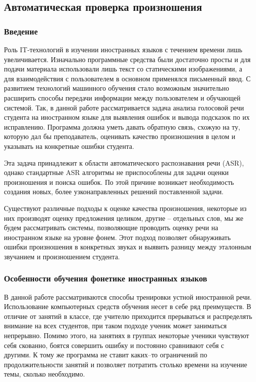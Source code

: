 \subsection{Автоматическая проверка произношения}

\subsubsection{Введение}
Роль IT-технологий в изучении иностранных языков с течением времени лишь увеличивается. Изначально программные средства были достаточно просты и для подачи материала использовали лишь текст со статическими изображениями, а для взаимодействия с пользователем в основном применялся письменный ввод. С развитием технологий машинного обучения стало возможным значительно расширить способы передачи информации между пользователем и обучающей системой. Так, в данной работе рассматривается задача анализа голосовой речи студента на иностранном языке для выявления ошибок и вывода подсказок по их исправлению. Программа должна уметь давать обратную связь, схожую на ту, которую дал бы преподаватель, оценивать качество произношения в целом и указывать на конкретные ошибки студента.

Эта задача принадлежит к области автоматического распознавания речи (ASR), однако стандартные ASR алгоритмы не приспособлены для задачи оценки произношения и поиска ошибок. По этой причине возникает необходимость создания новых, более узконаправленных решений поставленной задачи.

Существуют различные подходы к оценке качества произношения, некоторые из них производят оценку предложения целиком, другие -- отдельных слов, мы же будем рассматривать системы, позволяющие проводить оценку речи на иностранном языке на уровне фонем. Этот подход позволяет обнаруживать ошибки произношения в конкретных звуках и выявить разницу между эталонным звучанием и произношением студента.

\subsubsection{Особенности обучения фонетике иностранных языков}
В данной работе рассматриваются способы тренировки устной иностранной речи. Использование компьютерных средств обучения несет в себе ряд преимуществ. В отличие от занятий в классе, где учителю приходится прерываться и распределять внимание на всех студентов, при таком подходе ученик может заниматься непрерывно. Помимо этого, на занятиях в группах некоторые ученики чувствуют себя скованно, боятся совершить ошибку и постоянно сравнивают себя с другими. К тому же программа не ставит каких--то ограничений по продолжительности занятий и позволяет потратить столько времени на изучение темы, сколько необходимо.

